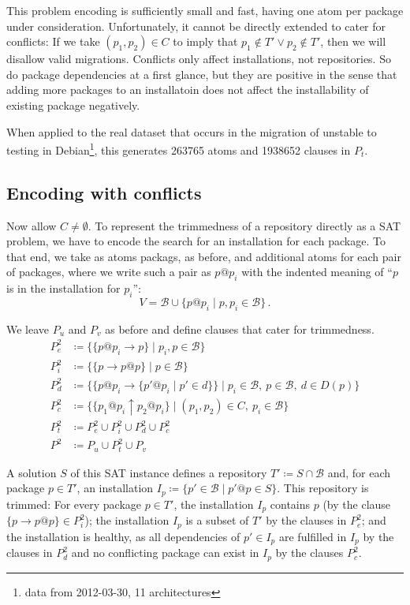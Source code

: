 \documentclass[halfparskip,11pt]{scrartcl}
\begin{document}
This problem encoding is sufficiently small and fast, having one atom per package under consideration. Unfortunately, it cannot be directly extended to cater for conflicts: If we take $(p_1,p_2)\in C$ to imply that $p_1 \notin T' \vee p_2 \notin T'$, then we will disallow valid migrations. Conflicts only affect installations, not repositories. So do package dependencies at a first glance, but they are positive in the sense that adding more packages to an installatoin does not affect the installability of existing package negatively.

When applied to the real dataset that occurs in the migration of unstable to testing in Debian\footnote{data from 2012-03-30, 11 architectures}, this generates 263765 atoms and 1938652 clauses in $P_t$.

\subsection{Encoding with conflicts}

Now allow $C\ne \emptyset$. To represent the trimmedness of a repository directly as a SAT problem, we have to encode the search for an installation for each package. To that end, we take as atoms packags, as before, and additional atoms for each pair of packages, where we write such a pair as $p@p_i$ with the indented meaning of ``$p$ is in the installation for $p_i$'':
\[
V = \mathcal B \cup \{ p@p_i \mid p,p_i \in \mathcal B \}\,.
\]

We leave $P_u$ and $P_v$ as before and define clauses that cater for trimmedness.
\begin{align*}
P^2_e &\coloneqq \{ \{p@p_i \to p\} \mid p_i,p \in\mathcal B\} \\
P^2_i &\coloneqq \{ \{p \to p@p\} \mid p \in\mathcal B\} \\
P^2_d &\coloneqq \{ \{p@p_i \to  \{p'@p_i \mid p'\in d\}\} \mid p_i\in \mathcal B,\ p\in \mathcal B,\ d \in D(p)\}\\
P^2_c &\coloneqq \{ \{p_1@p_i \uparrow p_2@p_i\} \mid (p_1,p_2)\in C,\ p_i\in \mathcal B\}\\
P^2_t &\coloneqq P^2_e \cup P^2_i \cup P^2_d \cup P^2_c \\
P^2 &\coloneqq P_u \cup P^2_t \cup P_v
\end{align*}
 
A solution $S$ of this SAT instance defines a repository $T' \coloneqq S\cap\mathcal B$ and, for each package $p\in T'$, an installation $I_p \coloneqq \{ p' \in \mathcal B \mid p'@p\in S\}$. This repository is trimmed: For every package $p\in T'$, the installation $I_p$ contains $p$ (by the clause $\{p \to p@p\}\in P^2_i$); the installation $I_p$ is a subset of $T'$ by the clauses in $P^2_e$; and the installation is healthy, as all dependencies of $p'\in I_p$ are fulfilled in $I_p$ by the clauses in $P^2_d$ and no conflicting package can exist in $I_p$ by the clauses $P^2_c$.
\end{document}
